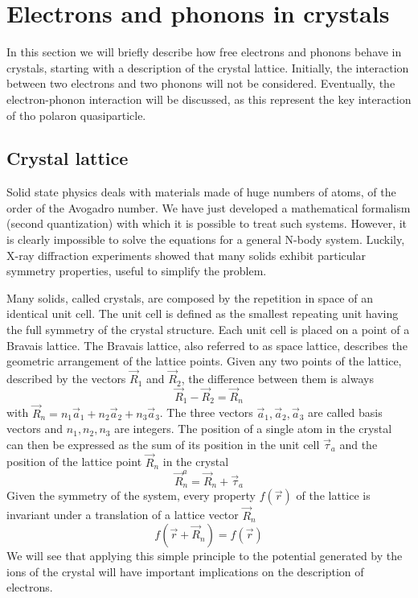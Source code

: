 \section{Electrons and phonons in crystals} \label{sec:electrons_phonons}
In this section we will briefly describe how free electrons and phonons behave in crystals, starting with a description of the crystal lattice. Initially, the interaction between two electrons and two phonons will not be considered. Eventually, the electron-phonon interaction will be discussed, as this represent the key interaction of tho polaron quasiparticle.
\subsection{Crystal lattice} \label{sec:crystals}
Solid state physics deals with materials made of huge numbers of atoms, of the order of the Avogadro number. We have just developed a mathematical formalism (second quantization) with which it is possible to treat such systems. However, it is clearly impossible to solve the equations for a general N-body system. Luckily, X-ray diffraction experiments showed that many solids exhibit particular symmetry properties, useful to simplify the problem.

Many solids, called crystals, are composed by the repetition in space of an identical unit cell. The unit cell is defined as the smallest repeating unit having the full symmetry of the crystal structure. Each unit cell is placed on a point of a Bravais lattice. The Bravais lattice, also referred to as space lattice, describes the geometric arrangement of the lattice points. Given any two points of the lattice, described by the vectors $\vec{R}_1$ and $\vec{R}_2$, the difference between them is always
\begin{equation}
    \vec{R}_1 - \vec{R}_2 = \vec{R}_n
\end{equation}
with $\vec{R}_n = n_1\vec{a}_1 + n_2\vec{a}_2 + n_3\vec{a}_3$. The three vectors $\vec{a}_1, \vec{a}_2, \vec{a}_3$ are called basis vectors and $n_1, n_2, n_3$ are integers. The position of a single atom in the crystal can then be expressed as the sum of its position in the unit cell $\vec{\tau}_a$ and the position of the lattice point $\vec{R}_n$ in the crystal
\begin{equation}
    \vec{R}_n^a = \vec{R}_n + \vec{\tau}_a
\end{equation}
Given the symmetry of the system, every property $f(\vec{r})$ of the lattice is invariant under a translation of a lattice vector $\vec{R}_n$
\begin{equation} \label{eq:translational_invariance}
    f(\vec{r}+\vec{R}_n) = f(\vec{r})
\end{equation}
We will see that applying this simple principle to the potential generated by the ions of the crystal will have important implications on the description of electrons.

